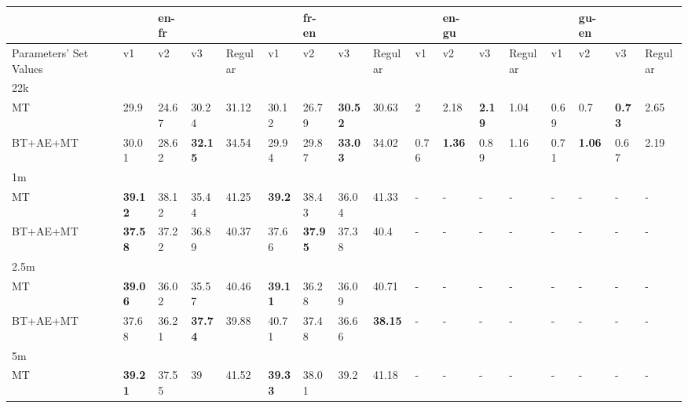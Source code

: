 
\begin{table*}[ht]
\tiny
\begin{tabular}{lB lll|l|lll|l|lll|l|lll|l}
\toprule
&&& \textbf{en-fr} & &&  & \textbf{fr-en} & && & \textbf{en-gu} &&&& \textbf{gu-en} && \\\hline
Parameters' Set Values &  & v1 & v2 & v3 &Regular& v1 & v2 & v3 &Regular& v1 & v2    & v3 &Regular& v1 & v2    & v3&Regular \\\hline\hline
22k  &  && &&&   &&&   &&&   & \\\hline
MT  &&29.9&24.67&30.24&31.12&30.12&26.79 &\textbf{30.52}&30.63&2&2.18&\textbf{2.19}&1.04&0.69&0.7 &\textbf{0.73}&2.65 \\
BT+AE+MT &&30.01&28.62&\textbf{32.15}&34.54&29.94&29.87&\textbf{33.03}&34.02&0.76&\textbf{1.36}&0.89&1.16 &0.71&\textbf{1.06}&0.67&2.19\\\hline\hline
1m  & &&&&&&&&&&&&\\\hline
MT & &\textbf{39.12}& 38.12&35.44 &41.25& \textbf{39.2}&38.43&36.04&41.33&-&-&-&-&-&-&-&-\\
BT+AE+MT & & \textbf{37.58}& 37.22& 36.89&40.37& 37.66& \textbf{37.95}& 37.38&40.4&-&-&-&-&-&-&-&-\\\hline\hline
2.5m  &&&&&&&&&&&&   &\\\hline
MT &  &\textbf{39.06}&36.02  &35.57&40.46&\textbf{39.11} &36.28&36.09&40.71&-&-&-&-&-&-&-&-\\
BT+AE+MT &  &37.68 & 36.21& \textbf{37.74} &39.88&40.71&37.48 &36.66& \textbf{38.15}&-&-&-&-&-&-&-&-\\\hline\hline
5m &&&&&&&&&&&&&\\\hline
MT  &&\textbf{39.21} &37.55&39&41.52&\textbf{39.33} &38.01&39.2&41.18&-&-&-&-&-&-&-&-\\

\end{tabular}
\end{table*}
